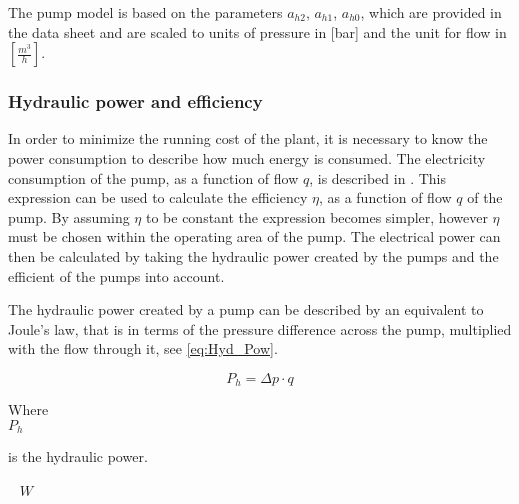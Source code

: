 The pump model is based on the parameters $a_{h2}$, $a_{h1}$, $a_{h0}$, which are provided in the data sheet and are scaled to units of pressure in [bar] and the unit for flow in ${[\frac{m^3}{h}]}$.

\subsubsection*{Hydraulic power and efficiency}
\label{pump_power}
In order to minimize the running cost of the plant, it is necessary to know the power consumption to describe how much energy is consumed. The electricity consumption of the pump, as a function of flow $q$, is described in \cite{master_aau}. This expression can be used to calculate the efficiency $\eta$, as a function of flow $q$ of the pump. By assuming $\eta$ to be constant the expression becomes simpler, however $\eta$ must be chosen within the operating area of the pump. The electrical power can then be calculated by taking the hydraulic power created by the pumps and the efficient of the pumps into account. 

The hydraulic power created by a pump can be described by an equivalent to Joule's law, that is in terms of the pressure difference across the pump, multiplied with the flow through it, see \eqref{eq:Hyd_Pow}.

\begin{equation}
P_h = \Delta p \cdot q 
\label{eq:Hyd_Pow}
\end{equation}

\begin{minipage}[t]{0.20\textwidth}
Where\\
\hspace*{8mm} $P_h$
\end{minipage}
\begin{minipage}[t]{0.68\textwidth}
\vspace*{2mm}
is the hydraulic power.
\end{minipage}
\begin{minipage}[t]{0.10\textwidth}
\vspace*{2mm}
\textcolor{White}{te}$\unit{W}$\\
\end{minipage}	

